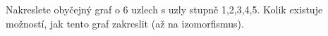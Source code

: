 Nakreslete obyčejný graf o 6 uzlech s uzly stupně 1,2,3,4,5. Kolik existuje
možností, jak tento graf zakreslit (až na izomorfismus).

